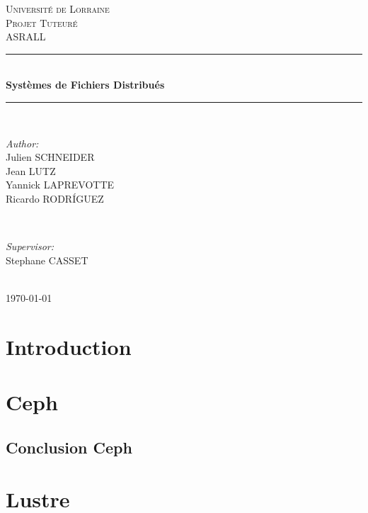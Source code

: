 \documentclass[12pt]{article}
\begin{document}
\begin{titlepage}
\newcommand{\HRule}{\rule{\linewidth}{0.5mm}}
\center 

\textsc{\LARGE Université de Lorraine}\\[1.5cm] 
\textsc{\Large Projet Tuteuré}\\[0.5cm]
\textsc{\large ASRALL}\\[0.5cm]

\HRule \\[0.4cm]
{ \huge \bfseries Systèmes de Fichiers Distribués}\\[0.4cm] 
\HRule \\[1.5cm]

\begin{minipage}{0.4\textwidth}
\begin{flushleft} \large
\emph{Author:}\\
Julien \textsc{SCHNEIDER}\\
Jean \textsc{LUTZ}\\
Yannick \textsc{LAPREVOTTE}\\
Ricardo \textsc{RODRÍGUEZ}\\
\end{flushleft}
\end{minipage}
~
\begin{minipage}{0.4\textwidth}
\begin{flushright} \large
\emph{Supervisor:} \\
 Stephane \textsc{CASSET} 
\end{flushright}
\end{minipage}\\[4cm]

{\large \today}\\[3cm] 

\vfill 
\end{titlepage}


\tableofcontents 

\newpage 

\section{Introduction} 
\section{Ceph}
\subsection{Conclusion Ceph}
\newpage
\section{Lustre}
\end{document}

